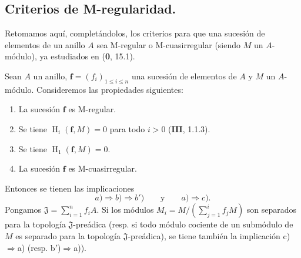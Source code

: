 \subsection{Criterios de M-regularidad.}
\label{subsection:IV.19.5}

Retomamos aquí, completándolos, los criterios para que una sucesión de elementos de un anillo $A$ sea M-regular o M-cuasirregular (siendo $M$ un $A$-módulo), ya estudiados en (\textbf{0}, 15.1).

\begin{theorem}[19.5.1]
\label{IV.19.5.1}
Sean $A$ un anillo, $\mathbf f=(f_i)_{1\leq i\leq n}$ una sucesión de elementos de $A$ y $M$ un $A$-módulo. Consideremos las propiedades siguientes:
\begin{enumerate}
  \item[\textup{a)}] La sucesión $\mathbf f$ es M-regular.
  \item[\textup{b)}] Se tiene $\operatorname{H}_i(\mathbf f,M)=0$ para todo $i>0$ \textup{(\textbf{III}, 1.1.3)}.
  \item[\textup{b$'$)}] Se tiene $\operatorname{H}_1(\mathbf f,M)=0$.
  \item[\textup{c)}] La sucesión $\mathbf f$ es M-cuasirregular.
\end{enumerate}
Entonces se tienen las implicaciones
\[
  \textit{a)}\Rightarrow\textit{b)}\Rightarrow\textit{b$'$)}\qquad\text{y}\qquad\textit{a)}\Rightarrow\textit{c)}.
\]
Pongamos $\mathfrak J=\sum_{i=1}^n f_iA$. Si los módulos $M_i=M/(\sum_{j=1}^i f_jM)$ son separados para la topología $\mathfrak J$-preádica \textup{(resp.} si todo módulo cociente de un submódulo de $M$ es separado para la topología $\mathfrak J$-preádica), se tiene también la implicación \textup{c)}$\Rightarrow$\textup{a)} \textup{(resp. b$'$)}$\Rightarrow$\textup{a))}.
\end{theorem}

